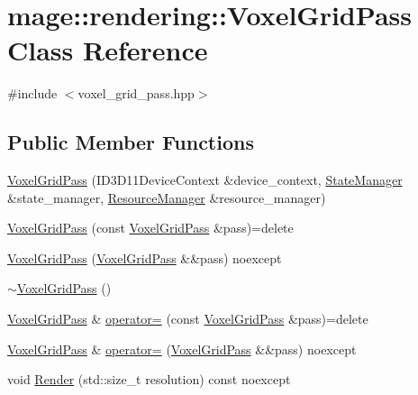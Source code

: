 \hypertarget{classmage_1_1rendering_1_1_voxel_grid_pass}{}\section{mage\+:\+:rendering\+:\+:Voxel\+Grid\+Pass Class Reference}
\label{classmage_1_1rendering_1_1_voxel_grid_pass}


{\ttfamily \#include $<$voxel\+\_\+grid\+\_\+pass.\+hpp$>$}

\subsection*{Public Member Functions}
\begin{DoxyCompactItemize}
\item 
\mbox{\hyperlink{classmage_1_1rendering_1_1_voxel_grid_pass_ad748e2aaccd4d34bcf5216815fe6d56f}{Voxel\+Grid\+Pass}} (I\+D3\+D11\+Device\+Context \&device\+\_\+context, \mbox{\hyperlink{classmage_1_1rendering_1_1_state_manager}{State\+Manager}} \&state\+\_\+manager, \mbox{\hyperlink{classmage_1_1rendering_1_1_resource_manager}{Resource\+Manager}} \&resource\+\_\+manager)
\item 
\mbox{\hyperlink{classmage_1_1rendering_1_1_voxel_grid_pass_a573934af1f4c245a1e544af785380267}{Voxel\+Grid\+Pass}} (const \mbox{\hyperlink{classmage_1_1rendering_1_1_voxel_grid_pass}{Voxel\+Grid\+Pass}} \&pass)=delete
\item 
\mbox{\hyperlink{classmage_1_1rendering_1_1_voxel_grid_pass_a08071670f68b888089b3f945c4ee2dc1}{Voxel\+Grid\+Pass}} (\mbox{\hyperlink{classmage_1_1rendering_1_1_voxel_grid_pass}{Voxel\+Grid\+Pass}} \&\&pass) noexcept
\item 
\mbox{\hyperlink{classmage_1_1rendering_1_1_voxel_grid_pass_a64361ec102c8f3f30d1e0d8edac33e5a}{$\sim$\+Voxel\+Grid\+Pass}} ()
\item 
\mbox{\hyperlink{classmage_1_1rendering_1_1_voxel_grid_pass}{Voxel\+Grid\+Pass}} \& \mbox{\hyperlink{classmage_1_1rendering_1_1_voxel_grid_pass_a6f696f05c430a0b84d8346099ec7d0aa}{operator=}} (const \mbox{\hyperlink{classmage_1_1rendering_1_1_voxel_grid_pass}{Voxel\+Grid\+Pass}} \&pass)=delete
\item 
\mbox{\hyperlink{classmage_1_1rendering_1_1_voxel_grid_pass}{Voxel\+Grid\+Pass}} \& \mbox{\hyperlink{classmage_1_1rendering_1_1_voxel_grid_pass_a9902536630f500e2399cbf7dd0e60452}{operator=}} (\mbox{\hyperlink{classmage_1_1rendering_1_1_voxel_grid_pass}{Voxel\+Grid\+Pass}} \&\&pass) noexcept
\item 
void \mbox{\hyperlink{classmage_1_1rendering_1_1_voxel_grid_pass_a032483cc14e79795a97929c7f11de68e}{Render}} (std\+::size\+\_\+t resolution) const noexcept
\end{DoxyCompactItemize}
